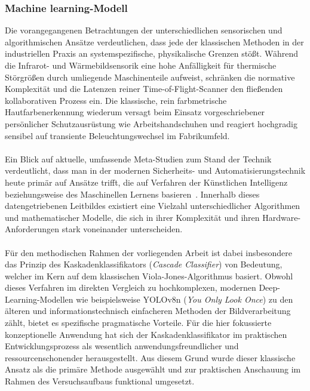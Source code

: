\subsubsection{Machine learning-Modell}
Die vorangegangenen Betrachtungen der unterschiedlichen sensorischen und algorithmischen Ansätze verdeutlichen, dass jede der klassischen Methoden in der industriellen Praxis an systemspezifische, physikalische Grenzen stößt. Während die Infrarot- und Wärmebildsensorik eine hohe Anfälligkeit für thermische Störgrößen durch umliegende Maschinenteile aufweist, schränken die normative Komplexität und die Latenzen reiner Time-of-Flight-Scanner den fließenden kollaborativen Prozess ein. Die klassische, rein farbmetrische Hautfarbenerkennung wiederum versagt beim Einsatz vorgeschriebener persönlicher Schutzausrüstung wie Arbeitshandschuhen und reagiert hochgradig sensibel auf transiente Beleuchtungswechsel im Fabrikumfeld. 
\\
\\Ein Blick auf aktuelle, umfassende Meta-Studien zum Stand der Technik verdeutlicht, dass man in der modernen Sicherheits- und Automatisierungstechnik heute primär auf Ansätze trifft, die auf Verfahren der Künstlichen Intelligenz beziehungsweise des Maschinellen Lernens basieren~\cite{Tamascelli2024}. Innerhalb dieses datengetriebenen Leitbildes existiert eine Vielzahl unterschiedlicher Algorithmen und mathematischer Modelle, die sich in ihrer Komplexität und ihren Hardware-Anforderungen stark voneinander unterscheiden. 
\\
\\Für den methodischen Rahmen der vorliegenden Arbeit ist dabei insbesondere das Prinzip des Kaskadenklassifikators (\textit{Cascade Classifier}) von Bedeutung, welcher im Kern auf dem klassischen Viola-Jones-Algorithmus basiert. Obwohl dieses Verfahren im direkten Vergleich zu hochkomplexen, modernen Deep-Learning-Modellen wie beispielsweise YOLOv8n (\textit{You Only Look Once}) zu den älteren und informationstechnisch einfacheren Methoden der Bildverarbeitung zählt, bietet es spezifische pragmatische Vorteile. Für die hier fokussierte konzeptionelle Anwendung hat sich der Kaskadenklassifikator im praktischen Entwicklungsprozess als wesentlich anwendungsfreundlicher und ressourcenschonender herausgestellt. Aus diesem Grund wurde dieser klassische Ansatz als die primäre Methode ausgewählt und zur praktischen Anschauung im Rahmen des Versuchsaufbaus funktional umgesetzt.

